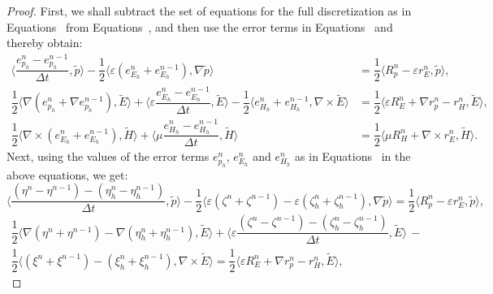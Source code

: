 \documentclass{amsart}
\theoremstyle{thmstyleone}%
\theoremstyle{thmstyletwo}%
\theoremstyle{thmstylethree}%
\newcommand{\aInnerproduct}[2]{\bigl\langle #1, #2 \bigr\rangle}
\begin{document}
\begin{proof}
First, we shall subtract the set of equations for the full discretization as in Equations~ from Equations~,  and then use the error terms in Equations~ and thereby obtain:
\begin{align*}
  \aInnerproduct{\dfrac{e_{p_h}^n - e_{p_h}^{n-1}}{\Delta t}}{\widetilde{p}} - \dfrac{1}{2}\aInnerproduct{ \varepsilon \left(e_{E_h}^n + e_{E_h}^{n-1} \right)}{\nabla \widetilde{p}} &= \dfrac{1}{2} \aInnerproduct{ R_p^{n} - \varepsilon r_E^n}{\widetilde{p}}, \\
  \dfrac{1}{2} \aInnerproduct{\nabla \left( e_{p_h}^n + \nabla e_{p_h}^{n - 1} \right)}{\widetilde{E}} + \aInnerproduct{\varepsilon \dfrac{e_{E_h}^n - e_{E_h}^{n - 1}}{\Delta t}}{\widetilde{E}} - \dfrac{1}{2}\aInnerproduct{e_{H_h}^n + e_{H_h}^{n - 1}}{\nabla \times \widetilde{E}} &= %
  \dfrac{1}{2} \aInnerproduct{\varepsilon R_E^n + \nabla r_p^n - r_H^n}{\widetilde{E}}, \\
  \dfrac{1}{2} \aInnerproduct{\nabla \times \left( e_{E_h}^n + e_{E_h}^{n - 1} \right)}{\widetilde{H}} + \aInnerproduct{\mu \dfrac{e_{H_h}^n - e_{H_h}^{n-1}}{\Delta t}}{\widetilde{H}} &= \dfrac{1}{2} \aInnerproduct{\mu R_H^n + \nabla \times r_E^n}{\widetilde{H}}.
\end{align*}
Next, using the values of the error terms $e_{p_h}^n$, $e_{E_h}^n$ and $e_{H_h}^n$ as in Equations~ in the above equations, we get:
\[
  \aInnerproduct{\dfrac{\left(\eta^n - \eta^{n - 1}\right) - \left(\eta^n_h - \eta^{n - 1}_h\right)}{\Delta t}}{\widetilde{p}} - \dfrac{1}{2}\aInnerproduct{ \varepsilon \left(\zeta^n + \zeta^{n - 1} \right) - \varepsilon \left(\zeta^n_h + \zeta^{n - 1}_h \right)}{\nabla \widetilde{p}}  = \dfrac{1}{2} \aInnerproduct{ R_p^{n} - \varepsilon r_E^n}{\widetilde{p}},
\]
\vspace{-1em} \begin{multline*}
  \dfrac{1}{2} \aInnerproduct{\nabla \left(\eta^n + \eta^{n - 1}\right) - \nabla \left(\eta^n_h + \eta^{n - 1}_h \right)}{\widetilde{E}} + \aInnerproduct{\varepsilon \dfrac{\left(\zeta^n - \zeta^{n - 1} \right) - \left(\zeta^n_h - \zeta^{n - 1}_h \right)}{\Delta t}}{\widetilde{E}} \, - \\
  \dfrac{1}{2}\aInnerproduct{\left(\xi^n + \xi^{n - 1} \right) - \left(\xi^n_h + \xi^{n - 1}_h \right)}{\nabla \times \widetilde{E}} = \dfrac{1}{2} \aInnerproduct{\varepsilon R_E^n + \nabla r_p^n - r_H^n}{\widetilde{E}},

\end{multline*}
\end{proof}
\end{document}

